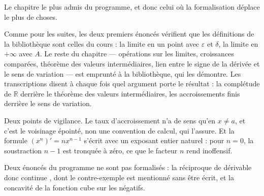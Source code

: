 Le chapitre le plus admis du programme, et donc celui où la formalisation déplace le plus de
choses.

Comme pour les suites, les deux premiers énoncés vérifient que les définitions de la
bibliothèque sont celles du cours : la limite en un point avec $\varepsilon$ et $\delta$,
la limite en $+\infty$ avec $A$. Le reste du chapitre — opérations sur les limites,
croissances comparées, théorème des valeurs intermédiaires, lien entre le signe de la dérivée
et le sens de variation — est emprunté à la bibliothèque, qui les démontre. Les transcriptions
disent à chaque fois quel argument porte le résultat : la complétude de $\mathbb{R}$ derrière
le théorème des valeurs intermédiaires, les accroissements finis derrière le sens de variation.

Deux points de vigilance. Le taux d'accroissement n'a de sens qu'en $x \ne a$, et c'est le
voisinage épointé, non une convention de calcul, qui l'assure. Et la formule
$(x^n)' = n x^{n-1}$ s'écrit avec un exposant entier naturel : pour $n = 0$, la soustraction
$n - 1$ est tronquée à zéro, ce que le facteur $n$ rend inoffensif.

Deux énoncés du programme ne sont pas formalisés : la réciproque de \og{} dérivable donc
continue \fg{}, dont le contre-exemple est mentionné sans être écrit, et la concavité de la
fonction cube sur les négatifs.
